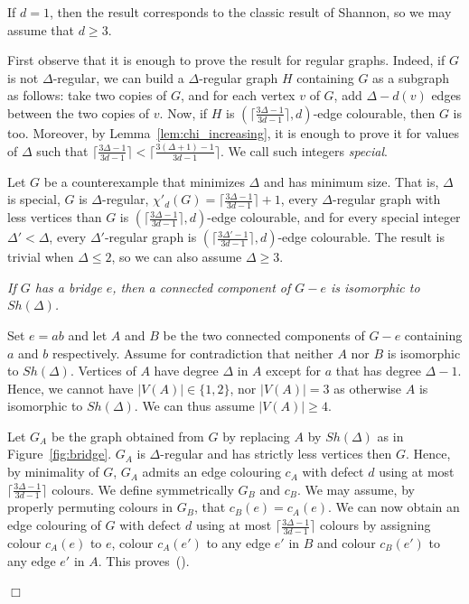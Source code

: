 \documentclass[11pt]{article}
\newcounter{claim}
\newenvironment{proof}[1][]%
 {\noindent {\setcounter{claim}{0}\sc proof ---
   }{#1}{}}{\hfill$\Box$\vspace{2ex}}
\newenvironment{claim}[1][]%
{\refstepcounter{claim}\vspace{1ex}\noindent{(\it\arabic{claim}){#1}{}}\it}{\vspace{1ex}}
\newenvironment{proofclaim}[1][]%
	{\noindent {}{#1}{}}{ This proves~(\arabic{claim}).\vspace{2ex}}
\begin{document}
\begin{proof}
If $d = 1$, then the result corresponds to the classic result of Shannon, so we may assume that $d \geq 3$. 

First observe that it is enough to prove the result for regular graphs.
Indeed, if $G$ is not $\Delta$-regular, we can build a $\Delta$-regular graph $H$ containing $G$ as a subgraph  as follows: take two copies of $G$, and for each vertex $v$ of $G$, add $\Delta -d(v)$ edges between the two copies of $v$. Now, if $H$ is $(\lceil \frac{3\Delta - 1}{3d - 1} \rceil, d)$-edge colourable, then $G$ is too. 
Moreover, by Lemma~\ref{lem:chi_increasing}, it is enough to prove it for values of $\Delta$ such that $\lceil \frac{3\Delta - 1}{3d - 1} \rceil < \lceil \frac{3(\Delta +1) - 1}{3d - 1} \rceil$. We call such integers \textit{special}. 


Let $G$ be a counterexample that minimizes  $\Delta$ and has minimum size. That is, $\Delta$ is special, $G$ is $\Delta$-regular, $\chi'_d(G) = \lceil \frac{3\Delta - 1}{3d - 1} \rceil +1$, every $\Delta$-regular graph with less vertices than $G$ is $(\lceil \frac{3\Delta - 1}{3d - 1} \rceil, d)$-edge colourable, and for every special integer $\Delta' < \Delta$, every $\Delta'$-regular graph is $( \lceil \frac{3\Delta' - 1}{3d - 1} \rceil, d)$-edge colourable. 
The result is trivial when $\Delta \leq 2$, so we can also assume $\Delta \geq 3$. 
\medskip 




\begin{claim}\label{lem:extremity_shannon}
If $G$ has a bridge $e$, then a connected component of $G - e$ is isomorphic to $Sh(\Delta)$. 
\end{claim}

\begin{proofclaim}
Set $e = ab$ and let $A$ and $B$ be the two connected components of $G - e$ containing $a$ and $b$ respectively. Assume for contradiction that neither $A$ nor $B$ is isomorphic to $Sh(\Delta)$. 
Vertices of $A$ have degree $\Delta$ in $A$ except for $a$ that has degree $\Delta -1$.  Hence, we cannot have $|V(A)| \in \{1, 2\}$, nor $|V(A)| = 3$ as otherwise $A$ is isomorphic to $Sh(\Delta)$. 
We can thus assume $|V(A)| \geq 4$.    

Let $G_A$ be the graph obtained from $G$ by replacing $A$ by $Sh(\Delta)$ as in  Figure~\ref{fig:bridge}. $G_A$ is $\Delta$-regular and has strictly less vertices then $G$. Hence, by minimality of $G$, $G_A$ admits an edge colouring $c_A$ with defect $d$ using at most  $\lceil \frac{3\Delta - 1}{3d - 1} \rceil$ colours. %
We define symmetrically $G_B$ and $c_B$. We may assume, by properly permuting colours in $G_B$, that $c_B(e) = c_A(e)$. 
 We can now obtain an edge colouring of $G$ with defect $d$ using at most $\lceil \frac{3\Delta - 1}{3d - 1} \rceil$ colours by assigning colour $c_A(e)$ to $e$, colour $c_{A}(e')$ to any edge $e'$ in $B$ and colour $c_{B}(e')$ to any edge $e'$ in $A$. 
\end{proofclaim}


\end{proof}
\end{document}
